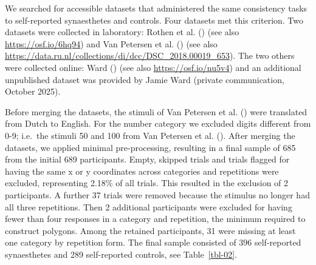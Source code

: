 \documentclass[
  man,
  floatsintext,
  longtable,
  nolmodern,
  notxfonts,
  notimes,
  colorlinks=true,linkcolor=blue,citecolor=blue,urlcolor=blue]{apa7}
\begin{document}
We searched for accessible datasets that administered the same
consistency tasks to self-reported synaesthetes and controls. Four
datasets met this criterion. Two datasets were collected in laboratory:
Rothen et al. () (see also
\href{https://osf.io/6hq94/files/osfstorage}{https://osf.io/6hq94}) and
Van Petersen et al. () (see also
\url{https://data.ru.nl/collections/di/dcc/DSC_2018.00019_653}). The two
others were collected online: Ward () (see
also \url{https://osf.io/nu5v4}) and an additional unpublished dataset
was provided by Jamie Ward (private communication, October 2025).

Before merging the datasets, the stimuli of Van Petersen et al.
() were translated from Dutch to
English. For the number category we excluded digits different from 0-9;
i.e.~the stimuli 50 and 100 from Van Petersen et al.
(). After merging the datasets, we
applied minimal pre-processing, resulting in a final sample of 685 from
the initial 689 participants. Empty, skipped trials and trials flagged
for having the same x or y coordinates across categories and repetitions
were excluded, representing 2.18\% of all trials. This resulted in the
exclusion of 2 participants. A further 37 trials were removed because
the stimulus no longer had all three repetitions. Then 2 additional
participants were excluded for having fewer than four responses in a
category and repetition, the minimum required to construct polygons.
Among the retained participants, 31 were missing at least one category
by repetition form. The final sample consisted of 396 self-reported
synaesthetes and 289 self-reported controls, see Table~\ref{tbl-02}.
\end{document}
